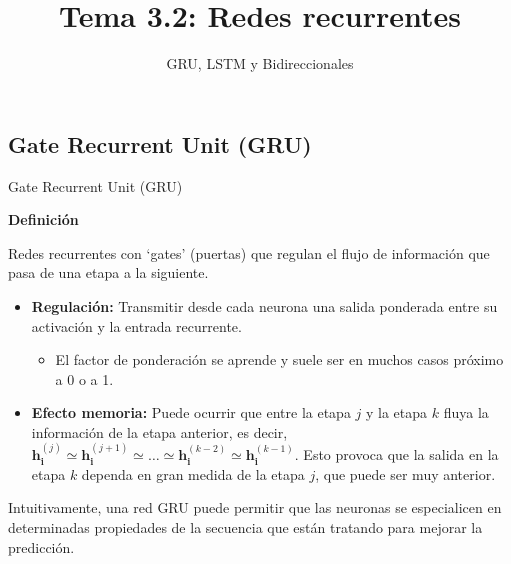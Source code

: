 \documentclass[aspectratio=169]{beamer}
\title{Tema 3.2: Redes recurrentes}
\subtitle{GRU, LSTM y Bidireccionales}
\newenvironment{blockm}[1]{%
  \begin{block}{\textbf{#1}}%
  }{%
  \end{block}%
  \vspace{1em}%
}
\begin{document}
\begin{frame}[plain]
	\titlepage 
\end{frame}

\logo{}


\subsection{Gate Recurrent Unit (GRU)}

\begin{frame}{Gate Recurrent Unit (GRU)}
	\begin{blockm}{Definición}
		Redes recurrentes con `gates' (puertas) que regulan el flujo de información que pasa de una etapa a la siguiente.
	\end{blockm}
	\begin{itemize}
		\item \textbf{Regulación:} Transmitir desde cada neurona una salida ponderada entre su activación y la entrada recurrente.
		\begin{itemize}
			\item El factor de ponderación se aprende y suele ser en muchos casos próximo a 0 o a 1.
		\end{itemize}
		\item \textbf{Efecto memoria:} Puede ocurrir que entre la etapa $j$ y la etapa $k$ fluya la información de la etapa anterior, es decir, 
				$\mathbf{h}_{\mathbf{i}}^{(j)} \simeq \mathbf{h}_{\mathbf{i}}^{(j+1)} \simeq \ldots \simeq \mathbf{h}_{\mathbf{i}}^{(k-2)} \simeq \mathbf{h}_{\mathbf{i}}^{(k-1)}$.	Esto provoca que la salida en la etapa $k$ dependa en gran medida de la etapa $j$, que puede ser muy anterior.
	\end{itemize}
	Intuitivamente, una red GRU puede permitir que las neuronas se especialicen en determinadas propiedades de la secuencia que están tratando para mejorar la predicción.
\end{frame}
\end{document}
